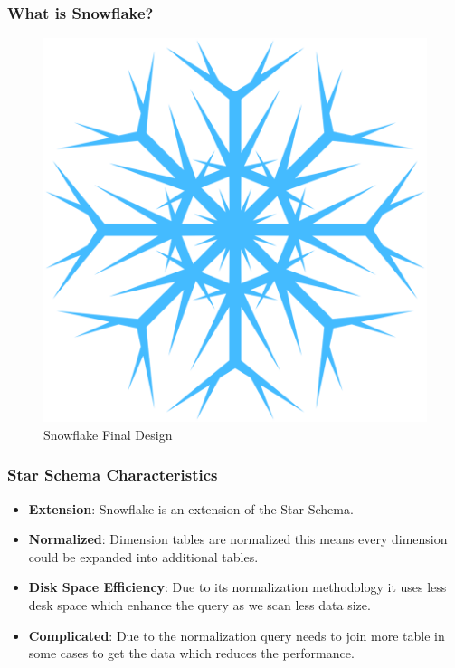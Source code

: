 \begin{frame}
	\frametitle{What is Snowflake?}
	\begin{figure}
		\includegraphics[scale=0.2]{Ch01-Introduction-data-management/12-Data-Model/04-Data-Model-Schema-Types/Figures/Frozen-Snowflake-PNG-File.png}
		\caption{Snowflake Final Design}
	\end{figure}
\end{frame}
\begin{frame}
\frametitle{Star Schema Characteristics}
	\begin{itemize}
		\item \textbf{Extension}: Snowflake is an extension of the Star Schema.
		\item \textbf{Normalized}: Dimension tables are normalized this means every dimension could be expanded into additional tables.
		\item \textbf{Disk Space Efficiency}: Due to its normalization methodology it uses less desk space which enhance the query as we scan less data size.
		\item \textbf{Complicated}: Due to the normalization query needs to join more table in some cases to get the data which reduces the performance.
	\end{itemize}

\end{frame}


